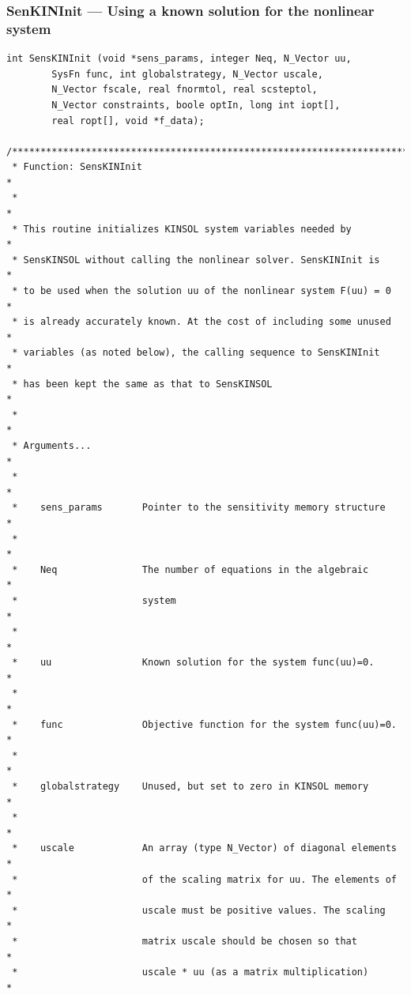 \documentclass[11pt]{article}
\begin{document}
\subsubsection{SenKINInit --- Using a known solution for the nonlinear
system}
\small
\begin{verbatim}
int SensKINInit (void *sens_params, integer Neq, N_Vector uu,
        SysFn func, int globalstrategy, N_Vector uscale,
        N_Vector fscale, real fnormtol, real scsteptol,
        N_Vector constraints, boole optIn, long int iopt[],
        real ropt[], void *f_data);

/**********************************************************************
 * Function: SensKINInit                                              *
 *                                                                    *
 * This routine initializes KINSOL system variables needed by         *
 * SensKINSOL without calling the nonlinear solver. SensKINInit is    *
 * to be used when the solution uu of the nonlinear system F(uu) = 0  *
 * is already accurately known. At the cost of including some unused  *
 * variables (as noted below), the calling sequence to SensKINInit    *
 * has been kept the same as that to SensKINSOL                       *
 *                                                                    *
 * Arguments...                                                       *
 *                                                                    *
 *    sens_params       Pointer to the sensitivity memory structure   *
 *                                                                    *
 *    Neq               The number of equations in the algebraic      *
 *                      system                                        *
 *                                                                    *
 *    uu                Known solution for the system func(uu)=0.     *
 *                                                                    *
 *    func              Objective function for the system func(uu)=0. *
 *                                                                    *
 *    globalstrategy    Unused, but set to zero in KINSOL memory      *
 *                                                                    *
 *    uscale            An array (type N_Vector) of diagonal elements *
 *                      of the scaling matrix for uu. The elements of *
 *                      uscale must be positive values. The scaling   *
 *                      matrix uscale should be chosen so that        *
 *                      uscale * uu (as a matrix multiplication)      *

\end{verbatim}
\end{document}
